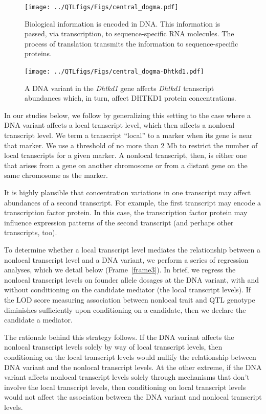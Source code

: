 \documentclass[oneside]{book}\usepackage[]{graphicx}\usepackage[]{color}
\begin{document}
\begin{figure}
  \centering
  \texttt{[image: ../QTLfigs/Figs/central\_dogma.pdf]}
  \caption{Biological information is encoded in DNA. This information is passed, via transcription, to sequence-specific RNA molecules. The process of translation transmits the information to sequence-specific proteins.}\label{fig:dogma}
\end{figure}


\begin{figure}
  \centering
  \texttt{[image: ../QTLfigs/Figs/central\_dogma-Dhtkd1.pdf]}
  \caption{A DNA variant in the \emph{Dhtkd1} gene affects \emph{Dhtkd1} transcript abundances which, in turn, affect DHTKD1 protein concentrations.}\label{fig:Dhtkd1}
\end{figure}


In our studies below, we follow \citet{keller2018genetic} by generalizing this setting to 
the case where a DNA variant affects a local transcript level, which then affects a 
nonlocal transcript level. 
We term a transcript ``local'' to a marker when its gene is near that marker. 
We use a threshold of no more than 2 Mb to restrict the 
number of local transcripts for a given marker. 
A nonlocal transcript, then, is either one that arises from a gene on another chromosome or 
from a distant gene on the same chromosome as the marker.

It is highly plausible that concentration variations in one transcript may 
affect abundances of a second transcript. 
For example, the first transcript may encode a transcription factor protein. 
In this case, the transcription factor protein may influence expression 
patterns of the second transcript (and perhaps other transcripts, too). 


To determine whether a local transcript level mediates the relationship between 
a nonlocal transcript level and a DNA variant, we perform a series of regression analyses, 
which we detail below (Frame~\ref{frame3}). 
In brief, we regress the nonlocal transcript levels on founder allele dosages at the DNA 
variant, with and without conditioning on the candidate mediator (the local transcript levels). 
If the LOD score measuring association between nonlocal trait and QTL genotype diminishes 
sufficiently upon conditioning on a candidate, 
then we declare the candidate a mediator.

The rationale behind this strategy follows. 
If the DNA variant affects the nonlocal transcript levels solely by way of local 
transcript levels, then conditioning on the local transcript levels would nullify the 
relationship between DNA variant and the nonlocal transcript levels. 
At the other extreme, if the DNA variant affects nonlocal transcript levels solely 
through mechanisms that don't involve the local transcript levels, then conditioning 
on local transcript levels would not affect the association between the DNA variant and 
nonlocal transcript levels.
\end{document}

